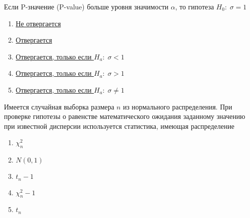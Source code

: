 \documentclass[t]{beamer}
\begin{document}
 \begin{frame} \label{9} 
\begin{block}{9} 

Если P-значение (P-value) больше уровня значимости  $\alpha$, то гипотеза  $H_0: \; \sigma=1$
 


 \end{block} 
\begin{enumerate} 
\item[] \hyperlink{9-Yes}{\beamergotobutton{} Не отвергается}
\item[] \hyperlink{9-No}{\beamergotobutton{} Отвергается}
\item[] \hyperlink{9-No}{\beamergotobutton{} Отвергается, только если  $H_a: \; \sigma<1$}
\item[] \hyperlink{9-No}{\beamergotobutton{} Отвергается, только если  $H_a: \; \sigma>1$}
\item[] \hyperlink{9-No}{\beamergotobutton{} Отвергается, только если  $H_a: \; \sigma\neq 1$}
\end{enumerate} 
\end{frame} 


 \begin{frame} \label{10} 
\begin{block}{10} 

Имеется случайная выборка размера $n$ из нормального распределения. При проверке гипотезы о равенстве математического ожидания заданному значению при известной дисперсии используется статистика, имеющая распределение
 


 \end{block} 
\begin{enumerate} 
\item[] \hyperlink{10-No}{\beamergotobutton{} $\chi^2_n$}
\item[] \hyperlink{10-Yes}{\beamergotobutton{} $N(0,1)$}
\item[] \hyperlink{10-No}{\beamergotobutton{} $t_n-1$}
\item[] \hyperlink{10-No}{\beamergotobutton{} $\chi^2_n-1$}
\item[] \hyperlink{10-No}{\beamergotobutton{} $t_n$}
\end{enumerate} 
\end{frame} 
\end{document}
